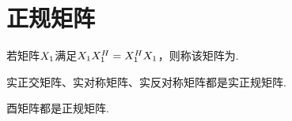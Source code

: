 \section{正规矩阵}
\begin{definition}
若矩阵\(X_1\)满足\(X_1X_1^H = X_1^HX_1\)，则称该矩阵为.
\end{definition}

\begin{property}
实正交矩阵、实对称矩阵、实反对称矩阵都是实正规矩阵.
\end{property}

\begin{property}
酉矩阵都是正规矩阵.
\end{property}

